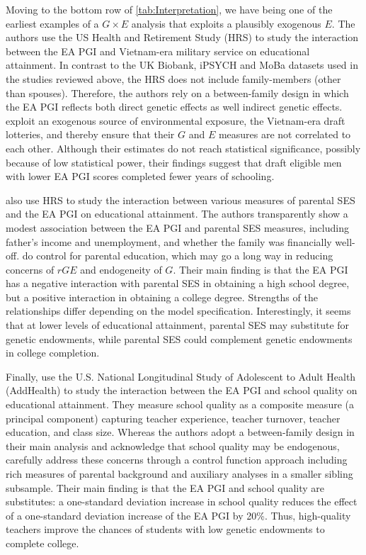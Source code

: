 \documentclass[12pt,a4paper]{article}
\begin{document}
\begin{bibunit}
Moving to the bottom row of \autoref{tab:Interpretation}, we have  \citet{Schmitz2017vietnam} being one of the earliest examples of a $G \times E$ analysis that exploits a plausibly exogenous $E$. The authors use the US Health and Retirement Study (HRS) to study the interaction between the EA PGI and Vietnam-era military service on educational attainment. In contrast to the UK Biobank, iPSYCH and MoBa datasets used in the studies reviewed above, the HRS does not include family-members (other than spouses). Therefore, the authors rely on a between-family design in which the EA PGI reflects both direct genetic effects as well indirect genetic effects. \citet{Schmitz2017vietnam} exploit an exogenous source of environmental exposure, the Vietnam-era draft lotteries, and thereby ensure that their $G$ and $E$ measures are not correlated to each other. Although their estimates do not reach statistical significance, possibly because of low statistical power, their findings suggest that draft eligible men with lower EA PGI scores completed fewer years of schooling. 

\citet{papageorge2020genes} also use HRS to study the interaction between various measures of parental SES and the EA PGI on educational attainment. The authors transparently show a modest association between the EA PGI and parental SES measures, including father's income and unemployment, and whether the family was financially well-off. \citet{papageorge2020genes} do control for parental education, which may go a long way in reducing concerns of $rGE$ and endogeneity of $G$. Their main finding is that the EA PGI has a negative interaction with parental SES in obtaining a high school degree, but a positive interaction in obtaining a college degree. Strengths of the relationships differ depending on the model specification. Interestingly, it seems that at lower levels of educational attainment, parental SES may substitute for genetic endowments, while parental SES could complement genetic endowments in college completion. 

Finally, \citet{arold2022genetic} use the U.S. National Longitudinal Study of Adolescent to Adult Health (AddHealth) to study the interaction between the EA PGI and school quality on educational attainment. They measure school quality as a composite measure (a principal component) capturing teacher experience, teacher turnover, teacher education, and class size. Whereas the authors adopt a between-family design in their main analysis and acknowledge that school quality may be endogenous, \citet{arold2022genetic} carefully address these concerns through a control function approach including rich measures of parental background and auxiliary analyses in a smaller sibling subsample. Their main finding is that the EA PGI and school quality are substitutes: a one-standard deviation increase in school quality reduces the effect of a one-standard deviation increase of the EA PGI by 20\%. Thus, high-quality teachers improve the chances of students with low genetic endowments to complete college.


\end{bibunit}
\end{document}
